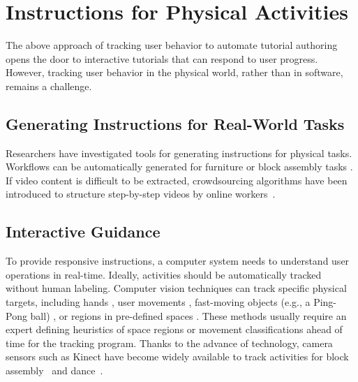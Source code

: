 


\section{Instructions for Physical Activities}
\label{related_physical}

The above approach of tracking user behavior to automate tutorial authoring opens the door to interactive tutorials that can respond to user progress. However, tracking user behavior in the physical world, rather than in software, remains a challenge.

\subsection{Generating Instructions for Real-World Tasks}
Researchers have investigated tools for generating instructions for physical tasks. Workflows can be automatically generated for furniture \cite{agrawala2003designing} or block assembly tasks \cite{Gupta:2012ku}.
%
If video content is difficult to be extracted, crowdsourcing algorithms have been introduced to structure step-by-step videos by online workers~\cite{Kim:2014:CSI:2611222.2556986}.
%

\subsection{Interactive Guidance}
To provide responsive instructions, a computer system needs to understand user operations in real-time. Ideally, activities should be automatically tracked without human labeling.
%
Computer vision techniques can track specific physical targets, including hands \cite{Ranjan:2008}, user movements \cite{Wilson:2012fb}, fast-moving objects (e.g., a Ping-Pong ball) \cite{Okumura:2011tr}, or regions in pre-defined spaces \cite{Ranjan:2007}.
%
These methods usually require an expert defining heuristics of space regions or movement classifications ahead of time for the tracking program.
%
Thanks to the advance of technology, camera sensors such as Kinect have become widely available to track activities for block assembly~\cite{Gupta:2012ku} and dance~\cite{Anderson:2013:YEM:2501988.2502045}.

